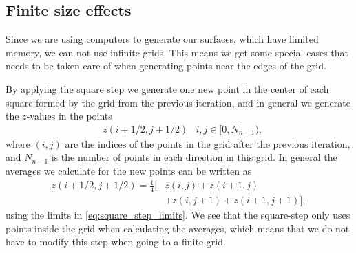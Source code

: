\subsection{Finite size effects\label{sec:diamond_square_2d_finite}}
Since we are using computers to generate our surfaces, which have limited memory, we can not use infinite grids. This means we get some special cases that needs to be taken care of when generating points near the edges of the grid.

By applying the square step we generate one new point in the center of each square formed by the grid from the previous iteration, and in general we generate the $z$-values in the points
\begin{align}
    &z(i+1/2, j+1/2) & i,j \in [0, N_{n-1}), \label{eq:square_step_limits}
\end{align}
where $(i,j)$ are the indices of the points in the grid after the previous iteration, and $N_{n-1}$ is the number of points in each direction in this grid. In general the averages we calculate for the new points can be written as
\begin{align}
    z(i+1/2, j+1/2) 
    = \frac{1}{4}\Big[
        &z(i, j) + z(i+1, j) \nonumber\\
        &+ z(i, j+1) + z(i+1, j+1)
    \Big],
    \label{eq:square_step}
\end{align}
using the limits in \cref{eq:square_step_limits}. We see that the square-step only uses points inside the grid when calculating the averages, which means that we do not have to modify this step when going to a finite grid.

